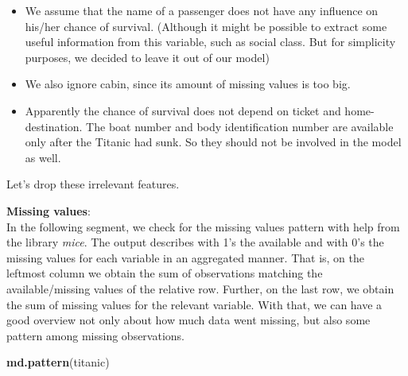 \documentclass[12,]{article}
\newenvironment{Shaded}{\begin{snugshade}}{\end{snugshade}}
\newcommand{\KeywordTok}[1]{\textcolor[rgb]{0.13,0.29,0.53}{\textbf{#1}}}
\newcommand{\StringTok}[1]{\textcolor[rgb]{0.31,0.60,0.02}{#1}}
\newcommand{\CommentTok}[1]{\textcolor[rgb]{0.56,0.35,0.01}{\textit{#1}}}
\newcommand{\OperatorTok}[1]{\textcolor[rgb]{0.81,0.36,0.00}{\textbf{#1}}}
\newcommand{\NormalTok}[1]{#1}
\providecommand{\tightlist}{%
  \setlength{\itemsep}{0pt}\setlength{\parskip}{0pt}}
\begin{document}
\begin{itemize}
\tightlist
\item
  We assume that the name of a passenger does not have any influence on
  his/her chance of survival. (Although it might be possible to extract
  some useful information from this variable, such as social class. But
  for simplicity purposes, we decided to leave it out of our model)
\item
  We also ignore cabin, since its amount of missing values is too big.
\item
  Apparently the chance of survival does not depend on ticket and
  home-destination. The boat number and body identification number are
  available only after the Titanic had sunk. So they should not be
  involved in the model as well.
\end{itemize}

Let's drop these irrelevant features.

\begin{Shaded}
\end{Shaded}

\textbf{Missing values}:\\
In the following segment, we check for the missing values pattern with
help from the library \emph{mice}. The output describes with 1's the
available and with 0's the missing values for each variable in an
aggregated manner. That is, on the leftmost column we obtain the sum of
observations matching the available/missing values of the relative row.
Further, on the last row, we obtain the sum of missing values for the
relevant variable. With that, we can have a good overview not only about
how much data went missing, but also some pattern among missing
observations.

\begin{Shaded}
\begin{Highlighting}[]
\KeywordTok{md.pattern}\NormalTok{(titanic)}
\end{Highlighting}
\end{Shaded}
\end{document}
